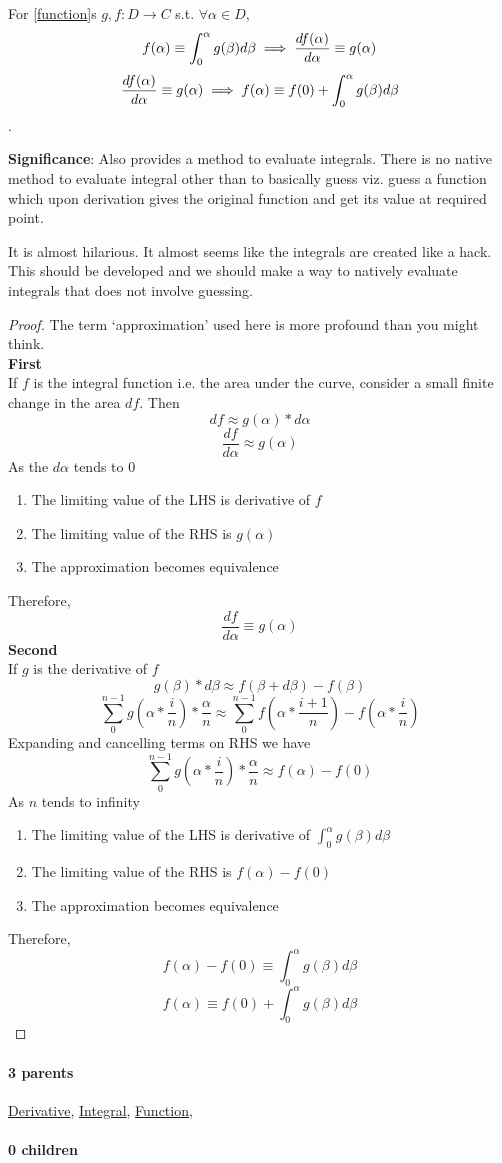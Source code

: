 \documentclass[./main.tex]{subfiles}
\begin{document}
For [\hyperref[statement:Function]{function}]s $g, f:D \to C$ s.t. $\forall \alpha \in D$,
\[
  f(\alpha) \equiv \int_{0}^{\alpha} g(\beta) d\beta
  \implies
  \frac{df(\alpha)}{d\alpha} \equiv g(\alpha)
\]
\[
  \frac{df(\alpha)}{d\alpha} \equiv g(\alpha)
  \implies
  f(\alpha) \equiv f(0) + \int_{0}^{\alpha} g(\beta) d\beta
\]
.
\par
{\color{magenta} \textbf{Significance}:
Also provides a method to evaluate integrals.
There is no native method to evaluate integral other than to basically guess viz. guess a function which upon derivation gives the original function and get its value at required point.

It is almost hilarious.
It almost seems like the integrals are created like a hack.
This should be developed and we should make a way to natively evaluate integrals that does not involve guessing.
\par}
\begin{proof}
The term `approximation' used here is more profound than you might think.
\\
\textbf{First}
\\
If $f$ is the integral function i.e. the area under the curve, consider a small finite change in the area $df$.
Then
\[
  df \approx g(\alpha) * d\alpha
\]
\[
  \frac{df}{d\alpha} \approx g(\alpha)
\]
As the $d\alpha$ tends to 0
\begin{enumerate}[nolistsep]
  \item The limiting value of the LHS is derivative of $f$
  \item The limiting value of the RHS is $g(\alpha)$
  \item The approximation becomes equivalence
\end{enumerate}
Therefore,
\[
  \frac{df}{d\alpha} \equiv g(\alpha)
\]
\textbf{Second}
\\
If $g$ is the derivative of $f$
\[
  g(\beta) * d\beta \approx f(\beta + d\beta) - f(\beta)
\]
\[
  \sum_{0}^{n-1} g(\alpha * \frac{i}{n}) * \frac{\alpha}{n} \approx \sum_{0}^{n-1} f(\alpha * \frac{i + 1}{n}) - f(\alpha * \frac{i}{n})
\]
Expanding and cancelling terms on RHS we have
\[
  \sum_{0}^{n-1} g(\alpha * \frac{i}{n}) * \frac{\alpha}{n} \approx f(\alpha) - f(0)
\]
As $n$ tends to infinity
\begin{enumerate}[nolistsep]
  \item The limiting value of the LHS is derivative of $\int_{0}^{\alpha} g(\beta) d\beta$
  \item The limiting value of the RHS is $f(\alpha) - f(0)$
  \item The approximation becomes equivalence
\end{enumerate}
Therefore,
\[
  f(\alpha) - f(0) \equiv \int_{0}^{\alpha} g(\beta) d\beta
\]
\[
  f(\alpha) \equiv f(0) + \int_{0}^{\alpha} g(\beta) d\beta
\]
\end{proof}\par
\paragraph{3 parents} \hyperref[statement:Derivative]{Derivative}, \hyperref[statement:Integral]{Integral}, \hyperref[statement:Function]{Function}, 
\paragraph{0 children} 
\end{document}

